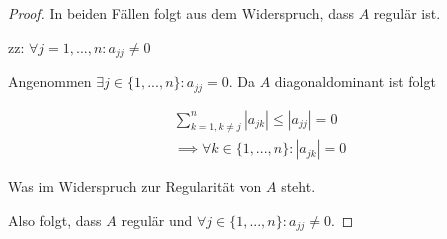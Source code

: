 \documentclass[]{article}
\begin{document}
\begin{proof}
	In beiden Fällen folgt aus dem Widerspruch, dass $A$ regulär ist.
	
	zz: $\forall j=1, ..., n: a_{jj}\neq 0$
	
	Angenommen $\exists j\in \{1, ..., n\}: a_{jj} = 0$. Da $A$ diagonaldominant ist folgt
	
	\begin{align*}
		\sum_{k=1,k\neq j}^{n}|a_{jk}| \leq |a_{jj}| = 0\\
		\implies \forall k\in\{1, ..., n\}: |a_{jk}| = 0
	\end{align*}

	Was im Widerspruch zur Regularität von $A$ steht.
	
	Also folgt, dass $A$ regulär und $\forall j\in\{1,...,n\}:a_{jj}\neq 0$.
\end{proof}
\end{document}
